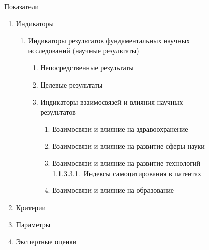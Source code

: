 \begin{multicols}{2}
     \begin{figure*}[b] 
\begin{center}
   \begin{fmpage}{155mm}
    Показатели
     \begin{center}
     \begin{enumerate}[1.]
     \item Индикаторы\\[-13pt]
     \begin{enumerate}[{1.}1]
\item Индикаторы результатов фундаментальных 
научных исследований (научные результаты)\\[-13pt]
\begin{enumerate}[{1.1.}1]
\item
Непосредственные результаты\\[-13pt]
\item Целевые результаты\\[-13pt]
\item Индикаторы взаимосвязей и влияния 
научных результатов\\[-13pt]
\begin{enumerate}[{1.1.3.}1]
\item 
Взаимосвязи и влияние на здравоохранение\\[-13pt]
\item 
Взаимосвязи и влияние на развитие сферы 
науки\\[-13pt]
\item Взаимосвязи и влияние на развитие 
технологий\\

1.1.3.3.1.~Индексы самоцитирования в патентах
\item Взаимосвязи и влияние на образование\\[-13pt]
\end{enumerate}
\end{enumerate}
\end{enumerate}
\item Критерии\\[-13pt]
\item  Параметры\\[-13pt]
\item  Экспертные оценки
\end{enumerate}

      \end{center}
       \end{fmpage}
\end{center}
      \end{figure*}


\end{multicols}
